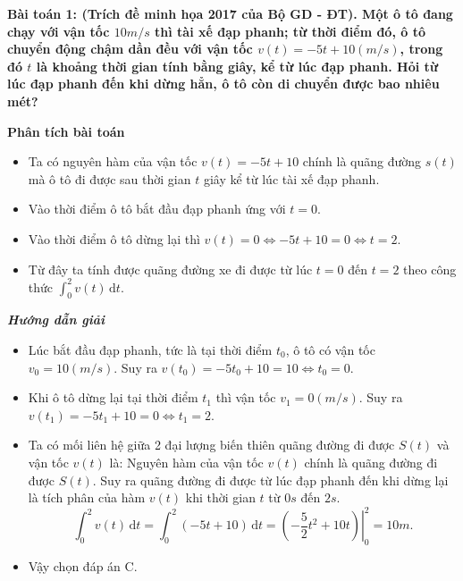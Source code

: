 \documentclass[12pt,a4paper]{article}
\newcommand{\dd}{\,\mathrm{d}}
\newcommand{\analysis}{\noindent\raisebox{0.15ex}{\rule{1.6ex}{1.6ex}}\hspace{4pt}\textbf{Phân tích bài toán}\par}
\newcommand{\solution}{\begin{center}\textbf{\textit{Hướng dẫn giải}}\end{center}\par}
\begin{document}
\textbf{Bài toán 1: (Trích đề minh họa 2017 của Bộ GD - ĐT). Một ô tô đang chạy với vận tốc $10m/s$ thì tài xế đạp phanh; từ thời điểm đó, ô tô chuyển động chậm dần đều với vận tốc $v(t)=-5t+10(m/s)$, trong đó $t$ là khoảng thời gian tính bằng giây, kể từ lúc đạp phanh. Hỏi từ lúc đạp phanh đến khi dừng hẳn, ô tô còn di chuyển được bao nhiêu mét?}\par\medskip
\begin{center}\end{center}
\begin{analysisbox}
\analysis
\begin{itemize}
\item Ta có nguyên hàm của vận tốc $v(t)=-5t+10$ chính là quãng đường $s(t)$ mà ô tô đi được sau thời gian $t$ giây kể từ lúc tài xế đạp phanh.
\item Vào thời điểm ô tô bắt đầu đạp phanh ứng với $t=0$.
\item Vào thời điểm ô tô dừng lại thì $v(t)=0\Leftrightarrow -5t+10=0\Leftrightarrow t=2$.
\item Từ đây ta tính được quãng đường xe đi được từ lúc $t=0$ đến $t=2$ theo công thức
$\displaystyle\int_0^2v(t)\dd t$.
\end{itemize}
\end{analysisbox}

\solution
\begin{itemize}
\item Lúc bắt đầu đạp phanh, tức là tại thời điểm $t_0$, ô tô có vận tốc $v_0=10(m/s)$. Suy ra
$v(t_0)=-5t_0+10=10\Leftrightarrow t_0=0$.
\item Khi ô tô dừng lại tại thời điểm $t_1$ thì vận tốc $v_1=0(m/s)$. Suy ra
$v(t_1)=-5t_1+10=0\Leftrightarrow t_1=2$.
\item Ta có mối liên hệ giữa 2 đại lượng biến thiên quãng đường đi được $S(t)$ và vận tốc
$v(t)$ là: Nguyên hàm của vận tốc $v(t)$ chính là quãng đường đi được $S(t)$. Suy ra
quãng đường đi được từ lúc đạp phanh đến khi dừng lại là tích phân của hàm $v(t)$ khi
thời gian $t$ từ $0s$ đến $2s$.
\[
\int_0^2v(t)\dd t=\int_0^2(-5t+10)\dd t
=\left.\left(-\frac{5}{2}t^2+10t\right)\right|_0^2=10m.
\]
\item Vậy chọn đáp án C.
\end{itemize}
\end{document}
